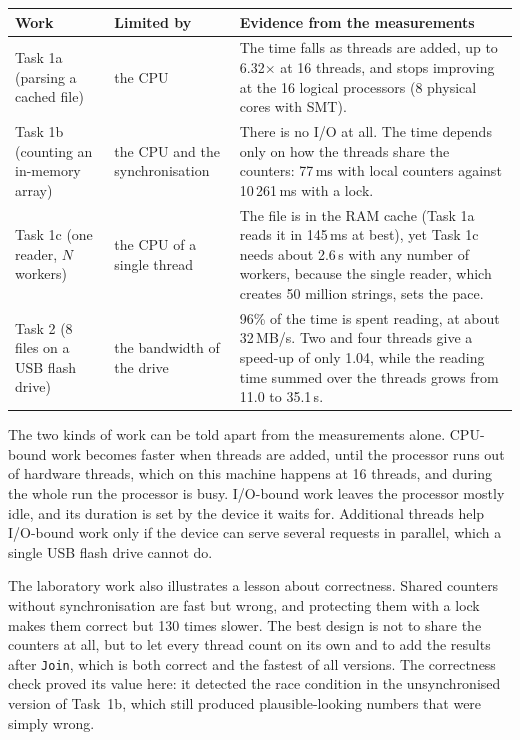 \documentclass[11pt,a4paper]{article}
\newcommand{\timesx}{\ensuremath{\times}}
\begin{document}
\begin{center}
\small
\begin{tabularx}{\linewidth}{@{}p{3.3cm}p{3.1cm}X@{}}
\toprule
Work & Limited by & Evidence from the measurements \\
\midrule
Task 1a (parsing a cached file) & the CPU &
  The time falls as threads are added, up to 6.32\timesx{} at 16 threads, and stops improving at the
  16 logical processors (8 physical cores with SMT). \\
Task 1b (counting an in-memory array) & the CPU and the synchronisation &
  There is no I/O at all. The time depends only on how the threads share the counters: 77\,ms with
  local counters against 10\,261\,ms with a lock. \\
Task 1c (one reader, $N$ workers) & the CPU of a single thread &
  The file is in the RAM cache (Task 1a reads it in 145\,ms at best), yet Task 1c needs about
  2.6\,s with any number of workers, because the single reader, which creates 50 million strings,
  sets the pace. \\
Task 2 (8 files on a USB flash drive) & the bandwidth of the drive &
  96\% of the time is spent reading, at about 32\,MB/s. Two and four threads give a speed-up of only
  1.04, while the reading time summed over the threads grows from 11.0 to 35.1\,s. \\
\bottomrule
\end{tabularx}
\end{center}

The two kinds of work can be told apart from the measurements alone. CPU-bound work becomes faster
when threads are added, until the processor runs out of hardware threads, which on this machine
happens at 16 threads, and during the whole run the processor is busy. I/O-bound work leaves the
processor mostly idle, and its duration is set by the device it waits for. Additional threads help
I/O-bound work only if the device can serve several requests in parallel, which a single USB flash
drive cannot do.

The laboratory work also illustrates a lesson about correctness. Shared counters without
synchronisation are fast but wrong, and protecting them with a lock makes them correct but 130 times
slower. The best design is not to share the counters at all, but to let every thread count on its own
and to add the results after \texttt{Join}, which is both correct and the fastest of all versions.
The correctness check proved its value here: it detected the race condition in the unsynchronised
version of Task~1b, which still produced plausible-looking numbers that were simply wrong.
\end{document}
